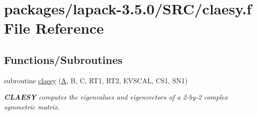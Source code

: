 \hypertarget{claesy_8f}{}\section{packages/lapack-\/3.5.0/\+S\+R\+C/claesy.f File Reference}
\label{claesy_8f}
\subsection*{Functions/\+Subroutines}
\begin{DoxyCompactItemize}
\item 
subroutine \hyperlink{group__complexSYauxiliary_gad7bdd5e02c8e280c12ff9fba3c712dd6}{claesy} (\hyperlink{classA}{A}, B, C, R\+T1, R\+T2, E\+V\+S\+C\+A\+L, C\+S1, S\+N1)
\begin{DoxyCompactList}\small\item\em {\bfseries C\+L\+A\+E\+S\+Y} computes the eigenvalues and eigenvectors of a 2-\/by-\/2 complex symmetric matrix. \end{DoxyCompactList}\end{DoxyCompactItemize}
